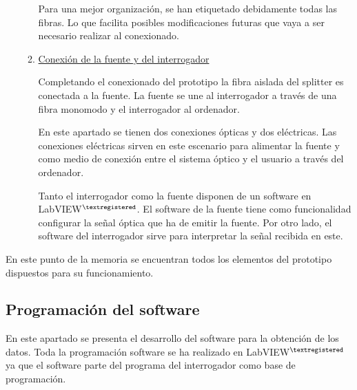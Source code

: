 \begin{itemize}
\begin{enumerate}
	
	Para una mejor organización, se han etiquetado debidamente todas las fibras. Lo que facilita posibles modificaciones futuras que vaya a ser necesario realizar al conexionado. 
		
	
	\item \underline{Conexión de la fuente y del interrogador}
	
	Completando el conexionado del prototipo la fibra aislada del splitter es conectada a la fuente. La fuente se une al interrogador a través de una fibra monomodo y el interrogador al ordenador. 
	
	En este apartado se tienen dos conexiones ópticas y dos eléctricas. Las conexiones eléctricas sirven en este escenario para alimentar la fuente y como medio de conexión entre el sistema óptico y el usuario a través del ordenador. 
	
	Tanto el interrogador como la fuente disponen de un software en LabVIEW$^{\textregistered}$. El software de la fuente tiene como funcionalidad configurar la señal óptica que ha de emitir la fuente. Por otro lado, el software del interrogador sirve para interpretar la señal recibida en este.
	
		
	\end{enumerate}
	 
	
\end{itemize}

En este punto de la memoria se encuentran todos los elementos del prototipo dispuestos para su funcionamiento.



\subsection{Programación del software}
\label{sec:programacion}

En este apartado se presenta el desarrollo del software para la obtención de los datos. Toda la programación software se ha realizado en LabVIEW$^{\textregistered}$ ya que el software parte del programa del interrogador como base de programación. 

